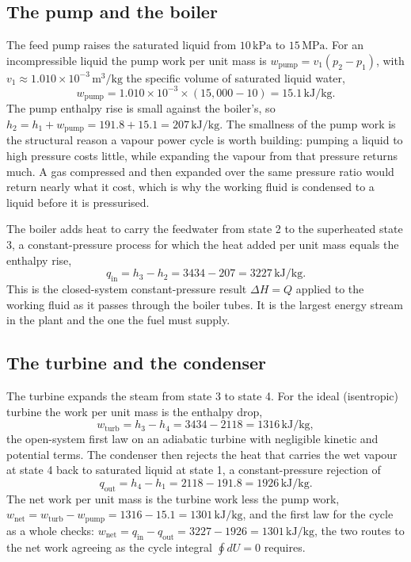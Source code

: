 \subsection{The pump and the boiler}

The feed pump raises the saturated liquid from $10\,\text{kPa}$ to
$15\,\text{MPa}$. For an incompressible liquid the pump work per unit
mass is $w_{\text{pump}} = v_1 (p_2 - p_1)$, with $v_1 \approx
1.010 \times 10^{-3}\,\text{m}^3/\text{kg}$ the specific volume of
saturated liquid water,
\[
w_{\text{pump}} = 1.010 \times 10^{-3} \times (15{,}000 - 10) =
15.1\,\text{kJ}/\text{kg}.
\]
The pump enthalpy rise is small against the boiler's, so
$h_2 = h_1 + w_{\text{pump}} = 191.8 + 15.1 = 207\,\text{kJ}/\text{kg}$.
The smallness of the pump work is the structural reason a vapour power
cycle is worth building: pumping a liquid to high pressure costs little,
while expanding the vapour from that pressure returns much. A gas
compressed and then expanded over the same pressure ratio would return
nearly what it cost, which is why the working fluid is condensed to a
liquid before it is pressurised.

The boiler adds heat to carry the feedwater from state 2 to the
superheated state 3, a constant-pressure process for which the heat
added per unit mass equals the enthalpy rise,
\[
q_{\text{in}} = h_3 - h_2 = 3434 - 207 = 3227\,\text{kJ}/\text{kg}.
\]
This is the closed-system constant-pressure result $\Delta H = Q$
applied to the working fluid as it passes through the boiler tubes. It
is the largest energy stream in the plant and the one the fuel must
supply.

\subsection{The turbine and the condenser}

The turbine expands the steam from state 3 to state 4. For the ideal
(isentropic) turbine the work per unit mass is the enthalpy drop,
\[
w_{\text{turb}} = h_3 - h_4 = 3434 - 2118 = 1316\,\text{kJ}/\text{kg},
\]
the open-system first law on an adiabatic turbine with negligible
kinetic and potential terms. The condenser then rejects the heat that
carries the wet vapour at state 4 back to saturated liquid at state 1, a
constant-pressure rejection of
\[
q_{\text{out}} = h_4 - h_1 = 2118 - 191.8 = 1926\,\text{kJ}/\text{kg}.
\]
The net work per unit mass is the turbine work less the pump work,
$w_{\text{net}} = w_{\text{turb}} - w_{\text{pump}} = 1316 - 15.1 =
1301\,\text{kJ}/\text{kg}$, and the first law for the cycle as a whole
checks: $w_{\text{net}} = q_{\text{in}} - q_{\text{out}} = 3227 - 1926 =
1301\,\text{kJ}/\text{kg}$, the two routes to the net work agreeing as
the cycle integral $\oint dU = 0$ requires.

